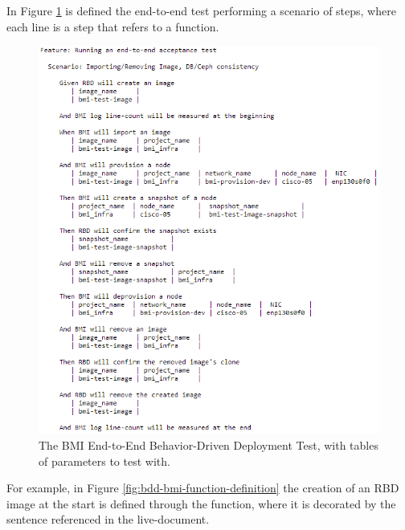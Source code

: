 In Figure \ref{fig:bdd-bmi-end-to-end-template} is defined the end-to-end test performing a scenario of steps, where each line is a step that refers to a function.

\pagebreak

\begin{figure}[!h] %
\begin{center}
\includegraphics[scale=1]{figures/end-to-end-bdd-template.png}
\end{center}
\caption{The BMI End-to-End Behavior-Driven Deployment Test, with tables of parameters to test with.}
\label{fig:bdd-bmi-end-to-end-template}
\end{figure}

For example, in Figure \ref{fig:bdd-bmi-function-definition} the creation of an RBD image at the start is defined through the  function, where it is decorated by the sentence referenced in the live-document.


